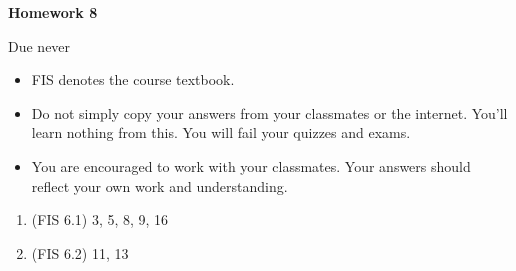 \documentclass{article}
\begin{document}
\begin{center}
    {\bf Homework 8}
    
    Due never
\end{center}

\begin{itemize}
    \item 
        FIS denotes the course textbook.
    \item
        Do not simply copy your answers from your classmates or the internet.
        You'll learn nothing from this. You will fail your quizzes and exams.
    \item
        You are encouraged to work with your classmates. Your answers
        should reflect your own work and understanding.
\end{itemize}

\begin{enumerate}
    \item
        (FIS 6.1) 3, 5, 8, 9, 16
    \item
        (FIS 6.2) 11, 13
\end{enumerate}
    
\end{document}
